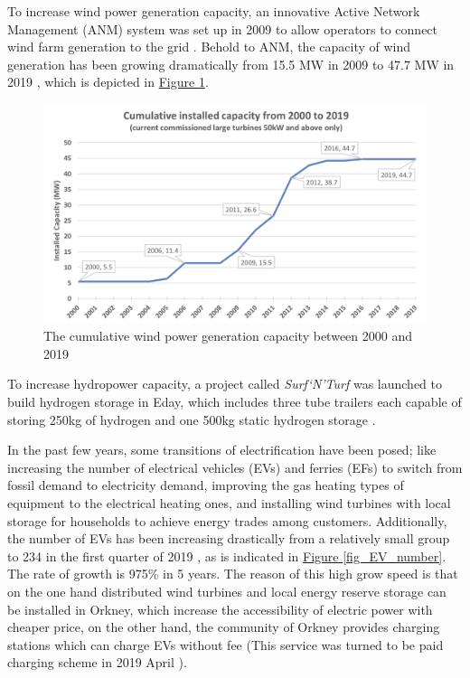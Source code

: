 \documentclass[12pt,a4paper]{report}
\begin{document}
        To increase wind power generation capacity, an innovative Active Network Management (ANM) system was set up in 2009 to allow operators to connect wind farm generation to the grid \cite{website:ANM}. 
        Behold to ANM, the capacity of wind generation has been growing dramatically from 15.5 MW in 2009 to 47.7 MW in 2019 \cite{report:OrkneyAudit}, which is depicted in \hyperref[fig_cummulative_wind_capacity]{Figure \ref*{fig_cummulative_wind_capacity}}. 
        
        \begin{figure}[ht]
            \centerline{\includegraphics[scale=1]{cummulativewindcapacity}}
            \caption{The cumulative wind power generation capacity between 2000 and 2019}
            \label{fig_cummulative_wind_capacity}
        \end{figure}

        To increase hydropower capacity, a project called \emph{Surf`N'Turf} was launched to build hydrogen storage in Eday, 
        which includes three tube trailers each capable of storing 250kg of hydrogen and one 500kg static hydrogen storage \cite{website:surfturf}. 

        In the past few years, some transitions of electrification have been posed; 
        like increasing the number of electrical vehicles (EVs) and ferries (EFs) to switch 
        from fossil demand to electricity demand, improving the gas heating types of 
        equipment to the electrical heating ones, and installing wind turbines with local 
        storage for households to achieve energy trades among customers. 
        Additionally, the number of EVs has been increasing drastically from a relatively small group to 234 in the first quarter of 2019 \cite{report:OrkneyAudit}, as is indicated in \hyperref[fig_EV_number]{Figure \ref*{fig_EV_number}}.
        The rate of growth is 975\% in 5 years. The reason of this high grow speed is that on the one hand distributed wind turbines and local energy reserve storage can be installed in Orkney, which increase the accessibility of electric power with cheaper price, on the other hand, the community of Orkney provides charging stations which can charge EVs without fee (This service was turned to be paid charging scheme in 2019 April \cite{report:OrkneyAudit}).
\end{document}
